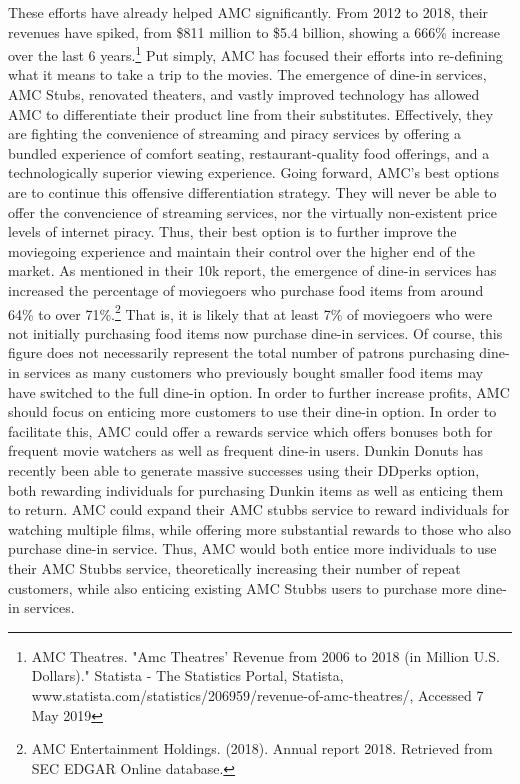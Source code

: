 \documentclass[12pt]{article}
\begin{document}
These efforts have already helped AMC significantly. From 2012 to 2018, their revenues have spiked, from \$811 million to \$5.4 billion, showing a 666\% increase over the last 6 years.\footnote{AMC Theatres. "Amc Theatres' Revenue from 2006 to 2018 (in Million U.S. Dollars)." Statista - The Statistics Portal, Statista, www.statista.com/statistics/206959/revenue-of-amc-theatres/, Accessed 7 May 2019} Put simply, AMC has focused their efforts into re-defining what it means to take a trip to the movies. The emergence of dine-in services, AMC Stubs, renovated theaters, and vastly improved technology has allowed AMC to differentiate their product line from their substitutes. Effectively, they are fighting the convenience of streaming and piracy services by offering a bundled experience of comfort seating, restaurant-quality food offerings, and a technologically superior viewing experience. Going forward, AMC's best options are to continue this offensive differentiation strategy. They will never be able to offer the convencience of streaming services, nor the virtually non-existent price levels of internet piracy. Thus, their best option is to further improve the moviegoing experience and maintain their control over the higher end of the market. As mentioned in their 10k report, the emergence of dine-in services has increased the percentage of moviegoers who purchase food items from around 64\% to over 71\%.\footnote{AMC Entertainment Holdings. (2018). Annual report 2018. Retrieved from SEC EDGAR Online database.} That is, it is likely that at least 7\% of moviegoers who were not initially purchasing food items now purchase dine-in services. Of course, this figure does not necessarily represent the total number of patrons purchasing dine-in services as many customers who previously bought smaller food items may have switched to the full dine-in option. In order to further increase profits, AMC should focus on enticing more customers to use their dine-in option. In order to facilitate this, AMC could offer a rewards service which offers bonuses both for frequent movie watchers as well as frequent dine-in users. Dunkin Donuts has recently been able to generate massive successes using their DDperks option, both rewarding individuals for purchasing Dunkin items as well as enticing them to return. AMC could expand their AMC stubbs service to reward individuals for watching multiple films, while offering more substantial rewards to those who also purchase dine-in service. Thus, AMC would both entice more individuals to use their AMC Stubbs service, theoretically increasing their number of repeat customers, while also enticing existing AMC Stubbs users to purchase more dine-in services. 
\end{document}
